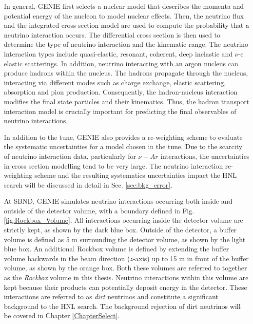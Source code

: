 In general, GENIE first selects a nuclear model that describes the momenta and potential energy of the nucleon to model nuclear effects.                                                    
Then, the neutrino flux and the integrated cross section model are used to compute the probability that a neutrino interaction occurs.
The differential cross section is then used to determine the type of neutrino interaction and the kinematic range.
The neutrino interaction types include quasi-elastic, resonant, coherent, deep inelastic and $\nu$-e elastic scatterings.
In addition, neutrino interacting with an argon nucleus can produce hadrons within the nucleus.
The hadrons propagate through the nucleus, interacting via different modes such as charge exchange, elastic scattering, absorption and pion production.
Consequently, the hadron-nucleus interaction modifies the final state particles and their kinematics.
Thus, the hadron transport interaction model is crucially important for predicting the final observables of neutrino interactions.

In addition to the tune, GENIE also provides a re-weighting scheme to evaluate the systematic uncertainties for a model chosen in the tune.
Due to the scarcity of neutrino interaction data, particularly for $\nu-Ar$ interactions, the uncertainties in cross section modelling tend to be very large. 
The neutrino interaction re-weighting scheme and the resulting systematics uncertainties impact the HNL search will be discussed in detail in Sec. \ref{sec:bkg_error}.

At SBND, GENIE simulates neutrino interactions occurring both inside and outside of the detector volume, with a boundary defined in Fig. \ref{fig:Rockbox_Volume}.  
All interactions occurring inside the detector volume are strictly kept, as shown by the dark blue box.
Outside of the detector, a buffer volume is defined as 5 m surrounding the detector volume, as shown by the light blue box.                       
An additional Rockbox volume is defined by extending the buffer volume backwards in the beam direction ($z$-axis) up to 15 m in front of the buffer volume, as shown by the orange box.
Both these volumes are referred to together as the \textit{Rockbox} volume in this thesis.
Neutrino interactions within this volume are kept because their products can potentially deposit energy in the detector.
These interactions are referred to as \textit{dirt} neutrinos and constitute a significant background to the HNL search.
The background rejection of dirt neutrinos will be covered in Chapter \ref{ChapterSelect}.


